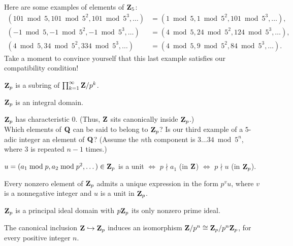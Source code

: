 Here are some examples of elements of $\mathbf{Z}_5$: 
\small\begin{align*}  (101\bmod{5}, 101\bmod{5^2}, 101\bmod{5^3}, \dots) &=  (1\bmod{5}, 1\bmod{5^2}, 101\bmod{5^3}, \dots),  \\
(-1\bmod{5}, -1\bmod{5^2}, -1\bmod{5^3}, \dots) &= (4\bmod{5}, 24\bmod{5^2}, 124\bmod{5^3}, \dots), \\
(4\bmod{5}, 34\bmod{5^2}, 334\bmod{5^3}, \dots) &= (4\bmod{5}, 9\bmod{5^2}, 84\bmod{5^3}, \dots).
\end{align*}
Take a moment to convince yourself that this last example satisfies our compatibility condition!

\normalsize

\begin{prob}\label{prob:52} $\mathbf{Z}_p$ is a subring of $\prod_{k=1}^{\infty}\mathbf{Z}/p^k$.
\end{prob}

\begin{prob}\label{prob:53} $\mathbf{Z}_p$ is an integral domain.
\end{prob}

\begin{prob}\label{ex:embedding0}\label{prob:54} $\mathbf{Z}_p$ has characteristic $0$. (Thus, $\mathbf{Z}$ sits canonically inside $\mathbf{Z}_p$.)\\
Which elements of $\mathbf{Q}$ can be said to belong to $\mathbf{Z}_p$? Is our third example of a $5$-adic integer an element of $\mathbf{Q}$? (Assume the $n$th component is $3\dots 34\bmod{5^n}$, where $3$ is repeated $n-1$ times.)
\end{prob}

\begin{prob}\label{prob:55} $u = (a_1\bmod{p}, a_2\bmod{p^2}, \dots) \in \mathbf{Z}_p$ is a unit $\Longleftrightarrow$ $p\nmid a_1$ (in $\mathbf{Z}$) $\Longleftrightarrow$ $p\nmid u$ (in $\mathbf{Z}_p$).
\end{prob}


\begin{prob}\label{prob:56} Every nonzero element of $\mathbf{Z}_p$ admits a unique expression in the form $p^v u$, where $v$ is a nonnegative integer and $u$ is a unit in $\mathbf{Z}_p$.
\end{prob}

\begin{prob}\label{prob:57} $\mathbf{Z}_p$ is a principal ideal domain with $p\mathbf{Z}_p$ its only nonzero prime ideal.
\end{prob}

\begin{prob}\label{prob:58}\label{prob:justice} The canonical inclusion $\mathbf{Z}\hookrightarrow \mathbf{Z}_p$ induces an isomorphism $\mathbf{Z}/p^n \cong \mathbf{Z}_p/p^n\mathbf{Z}_p$, for every positive integer $n$.\end{prob}

